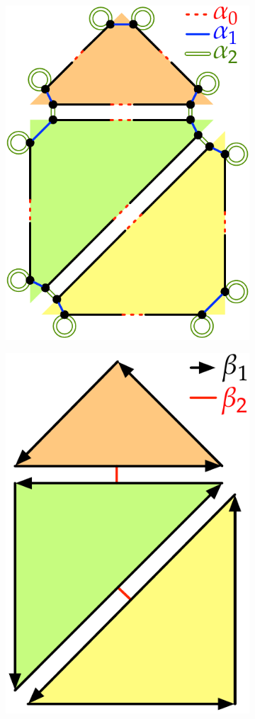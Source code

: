 \begin{figure}
\begin{subfigure}{0.33\linewidth}
\includegraphics[scale=0.7]{figs/2dcc-alphas}
\caption{}%
\label{subfig:2dcc-alphas}
\end{subfigure}%
\quad
\quad
\begin{subfigure}{0.33\linewidth}
\includegraphics[scale=0.7]{figs/2dcc-betas}

\end{subfigure}
\end{figure}
